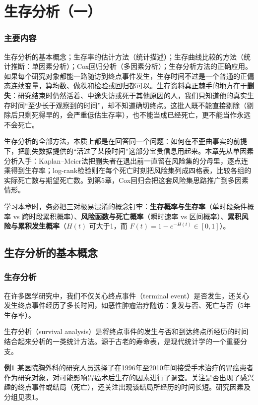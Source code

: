\chapter{生存分析（一）}
\subsection*{主要内容}
生存分析的基本概念；生存率的估计方法（统计描述）；生存曲线比较的方法（统计推断：单因素分析）；Cox回归分析（多因素分析）；生存分析方法的正确应用。
如果每个研究对象都能一路随访到终点事件发生，生存时间不过是一个普通的正偏态连续变量，算均数、做秩和检验或回归都可以。生存资料真正棘手的地方在于\textbf{删失}：研究结束时仍然活着、中途失访或死于其他原因的人，我们只知道他的真实生存时间“至少长于观察到的时间”，却不知道确切终点。这批人既不能直接剔除（剔除后只剩死得早的，会严重低估生存率），也不能当成已经死亡，更不能当作永远不会死亡。

生存分析的全部方法，本质上都是在回答同一个问题：如何在不歪曲事实的前提下，把删失数据提供的“活过了某段时间”这部分宝贵信息用起来。本章先从单因素分析入手：Kaplan--Meier法把删失者在退出前一直留在风险集的分母里，逐点连乘得到生存率；log-rank检验则在每个死亡时刻把风险集列成四格表，比较各组的实际死亡数与期望死亡数。到第5章，Cox回归会把这套风险集思路推广到多因素情形。

学习本章时，务必把三对极易混淆的概念钉牢：\textbf{生存概率与生存率}（单时段条件概率 vs 跨时段累积概率）、\textbf{风险函数与死亡概率}（瞬时速率 vs 区间概率）、\textbf{累积风险与累积发生概率}（$H(t)$ 可大于1，而 $F(t)=1-e^{-H(t)}\in[0,1]$）。
\section{生存分析的基本概念}
\subsection{生存分析}
在许多医学研究中，我们不仅关心终点事件（terminal event）是否发生，还关心发生终点事件经历了多长时间，如恶性肿瘤治疗随访：复发与否、死亡与否（5年生存率）。

生存分析（survival analysis）是将终点事件的发生与否和到达终点所经历的时间结合起来分析的一类统计方法。源于古老的寿命表，是现代统计学的一个重要分支。

\textbf{例1} 某医院胸外科的研究人员选择了在1996年至2010年间接受手术治疗的胃癌患者作为研究对象，对可能影响胃癌术后生存的因素进行了调查。关注是否出现了感兴趣的终点事件或结局（死亡），还关注出现该结局所经历的时间长短。研究因素及分组见表1。

